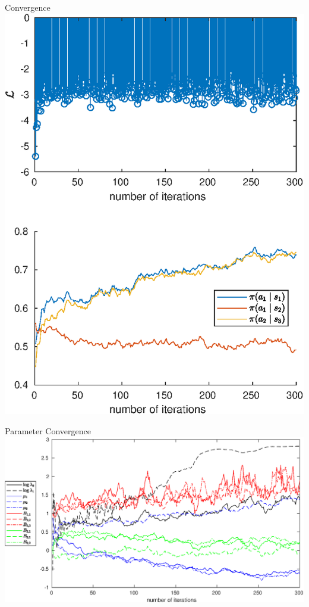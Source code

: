\documentclass{beamer}
\begin{document}
\begin{frame}{Convergence}
  \centering
  \includegraphics[height=0.9\textheight]{../mpaper/figures/convergence_new}
\end{frame}

\begin{frame}{Parameter Convergence}
  \includegraphics[width=\textwidth]{../mpaper/figures/parameter_convergence_new}
\end{frame}
\end{document}

